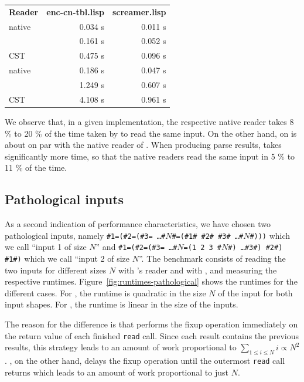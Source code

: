 \vspace{1em}\noindent%
\begin{tabular}{lrr}
  \textbf{Reader}         & \textbf{enc-cn-tbl.lisp} & \textbf{screamer.lisp}\\
  \sbcl{} native          & 0.034 s                  & 0.011 s\\
  \sbcl{} \eclector{}     & 0.161 s                  & 0.052 s\\
  \sbcl{} \eclector{} CST & 0.475 s                  & 0.096 s\\
  \ccl{} native           & 0.186 s                  & 0.047 s\\
  \ccl{} \eclector{}      & 1.249 s                  & 0.607 s\\
  \ccl{} \eclector{} CST  & 4.108 s                  & 0.961 s\\
\end{tabular}
\vspace{1em}

\noindent We observe that, in a given \cl{} implementation, the
respective native reader takes 8 \% to 20 \% of the time taken by
\eclector{} to read the same input.  On the other hand, \eclector{} on
\sbcl{} is about on par with the native reader of \ccl{}.  When
producing parse results, \eclector{} takes significantly more time, so
that the native readers read the same input in 5 \% to 11 \% of the
time.

\subsection{Pathological inputs}
\label{sec:pathological-inputs}

As a second indication of performance characteristics, we have chosen
two pathological inputs, namely
\texttt{\#1=(\#2=(\#3= \dots \#$N$\#=(\#1\# \#2\# \#3\# \dots \#$N$\#)))}
which we call ``input 1 of size $N$'' and
\texttt{\#1=(\#2=(\#3= \dots \#$N$=(1 2 3 \#$N$\#) \dots \#3\#) \#2\#) \#1\#)}
which we call ``input 2 of size $N$''.  The benchmark consists of
reading the two inputs for different sizes $N$ with \sbcl{}'s reader
and with \eclector{}, and measuring the respective runtimes.
Figure~\ref{fig:runtimes-pathological} shows the runtimes for the
different cases.  For \sbcl{}, the runtime is quadratic in the size
$N$ of the input for both input shapes.  For \eclector{}, the runtime
is linear in the size of the inputs.

The reason for the difference is that \sbcl{} performs the fixup
operation immediately on the return value of each finished
\texttt{read} call.  Since each result contains the previous results,
this strategy leads to an amount of work proportional to
$\sum_{1 \le i \le N} i \propto N^2$.  \eclector{}, on the other hand,
delays the fixup operation until the outermost \texttt{read} call
returns which leads to an amount of work proportional to just $N$.

